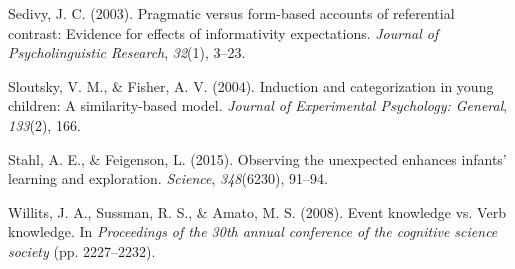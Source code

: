 \documentclass[10pt, letterpaper]{article}
\begin{document}
\leavevmode\hypertarget{ref-sedivy2003}{}%
Sedivy, J. C. (2003). Pragmatic versus form-based accounts of
referential contrast: Evidence for effects of informativity
expectations. \emph{Journal of Psycholinguistic Research}, \emph{32}(1),
3--23.

\leavevmode\hypertarget{ref-sloutsky2004}{}%
Sloutsky, V. M., \& Fisher, A. V. (2004). Induction and categorization
in young children: A similarity-based model. \emph{Journal of
Experimental Psychology: General}, \emph{133}(2), 166.

\leavevmode\hypertarget{ref-stahl2015}{}%
Stahl, A. E., \& Feigenson, L. (2015). Observing the unexpected enhances
infants' learning and exploration. \emph{Science}, \emph{348}(6230),
91--94.

\leavevmode\hypertarget{ref-willits2008}{}%
Willits, J. A., Sussman, R. S., \& Amato, M. S. (2008). Event knowledge
vs. Verb knowledge. In \emph{Proceedings of the 30th annual conference
of the cognitive science society} (pp. 2227--2232).


\end{document}
